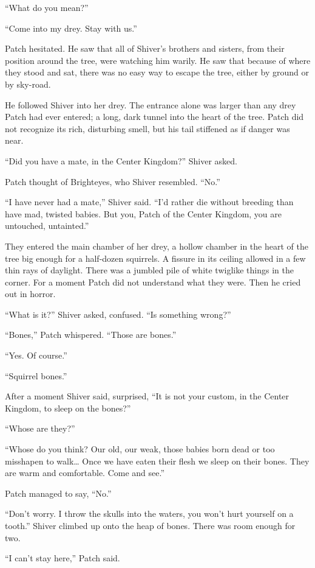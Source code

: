 \documentclass[ebook,oneside,openany,17pt]{memoir}
\begin{document}
“What do you mean?”

“Come into my drey. Stay with us.”

Patch hesitated. He saw that all of Shiver’s brothers and sisters,
from their position around the tree, were watching him warily. He saw
that because of where they stood and sat, there was no easy way to
escape the tree, either by ground or by sky-road.

He followed Shiver into her drey. The entrance alone was larger than
any drey Patch had ever entered; a long, dark tunnel into the heart of
the tree. Patch did not recognize its rich, disturbing smell, but his
tail stiffened as if danger was near.

“Did you have a mate, in the Center Kingdom?” Shiver asked.

Patch thought of Brighteyes, who Shiver resembled. “No.”

“I have never had a mate,” Shiver said. “I’d rather die without
breeding than have mad, twisted babies. But you, Patch of the Center
Kingdom, you are untouched, untainted.”

They entered the main chamber of her drey, a hollow chamber in the
heart of the tree big enough for a half-dozen squirrels. A fissure in
its ceiling allowed in a few thin rays of daylight. There was a
jumbled pile of white twiglike things in the corner. For a moment
Patch did not understand what they were. Then he cried out in horror.

“What is it?” Shiver asked, confused. “Is something wrong?”

“Bones,” Patch whispered. “Those are bones.”

“Yes. Of course.”

“Squirrel bones.”

After a moment Shiver said, surprised, “It is not your custom, in the
Center Kingdom, to sleep on the bones?”

“Whose are they?”

“Whose do you think? Our old, our weak, those babies born dead or too
misshapen to walk… Once we have eaten their flesh we sleep on their
bones. They are warm and comfortable. Come and see.”

Patch managed to say, “No.”

“Don’t worry. I throw the skulls into the waters, you won’t hurt
yourself on a tooth.” Shiver climbed up onto the heap of bones. There
was room enough for two.

“I can’t stay here,” Patch said.
\end{document}
